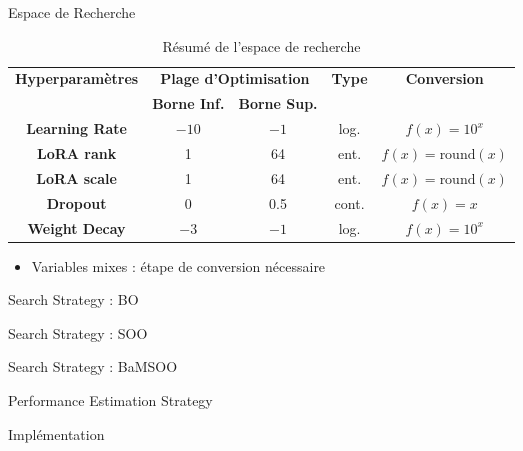 \begin{frame}{Espace de Recherche}

    \begin{table}[h]
        \centering
        \begin{tabular}{|c|c|c|c|c|}
            \hline
            \multirow{2}{*}{\textbf{ Hyperparamètres }} & \multicolumn{2}{|c|}{\textbf{Plage d'Optimisation}} &\multirow{2}{*}{\textbf{ Type }}& \multirow{2}{*}{\textbf{ Conversion }} \\
            \cline{2-3}
             & \textbf{ Borne Inf. } & \textbf{ Borne Sup. } & & \\
            \hline
            \textbf{Learning Rate} & $-10$ & $-1$ & log. & $f(x) = 10^{x}$ \\
            \hline
            \textbf{LoRA rank} & 1 & 64 &ent. &$f(x) = \text{round}(x)$ \\
            \hline
            \textbf{LoRA scale} &1 & 64 & ent. &$f(x) = \text{round}(x)$ \\
            \hline
            \textbf{Dropout} & 0 & 0.5 & cont.& $f(x) = x$ \\
            \hline
            \textbf{Weight Decay} & $-3$ & $-1$ &log.& $f(x) = 10^{x}$  \\
            \hline
        \end{tabular}
        \caption{Résumé de l'espace de recherche}
    \end{table}

    \begin{itemize}
        \item Variables mixes : étape de conversion nécessaire
    \end{itemize}

\end{frame}

\begin{frame}{Search Strategy : BO}

\end{frame}

\begin{frame}{Search Strategy : SOO}

\end{frame}

\begin{frame}{Search Strategy : BaMSOO}

\end{frame}

\begin{frame}{Performance Estimation Strategy}

\end{frame}

\begin{frame}{Implémentation}

\end{frame}
